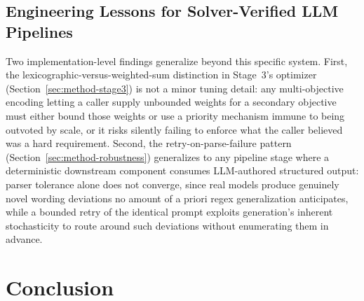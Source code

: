 \documentclass[lettersize,journal]{IEEEtran}
\begin{document}
\subsection{Engineering Lessons for Solver-Verified LLM Pipelines}

Two implementation-level findings generalize beyond this specific system. First, the lexicographic-versus-weighted-sum distinction in Stage~3's optimizer (Section~\ref{sec:method-stage3}) is not a minor tuning detail: any multi-objective encoding letting a caller supply unbounded weights for a secondary objective must either bound those weights or use a priority mechanism immune to being outvoted by scale, or it risks silently failing to enforce what the caller believed was a hard requirement. Second, the retry-on-parse-failure pattern (Section~\ref{sec:method-robustness}) generalizes to any pipeline stage where a deterministic downstream component consumes LLM-authored structured output: parser tolerance alone does not converge, since real models produce genuinely novel wording deviations no amount of a priori regex generalization anticipates, while a bounded retry of the identical prompt exploits generation's inherent stochasticity to route around such deviations without enumerating them in advance.

\section{Conclusion}
\label{sec:conclusion}
\end{document}
